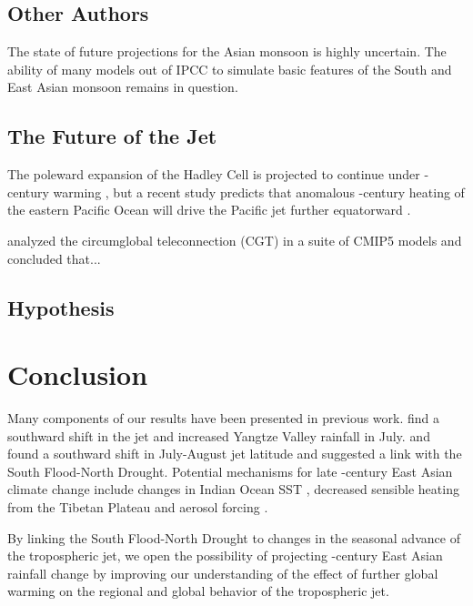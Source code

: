 \subsection{Other Authors}

	The state of future projections for the Asian monsoon is highly uncertain. The ability of many models out of IPCC to simulate basic features of the South and East Asian monsoon remains in question.
	
\subsection{The Future of the Jet}	
	
		The poleward expansion of the Hadley Cell is projected to continue under -century warming \citep{Frierson2007,Lu2007,Kang2012}, but a recent study predicts that anomalous -century heating of the eastern Pacific Ocean will drive the Pacific jet further equatorward \citep{Park2014}.
		
		\citep{Lee2014} analyzed the circumglobal teleconnection (CGT) in a suite of CMIP5 models and concluded that...
		
\subsection{Hypothesis}
 
\section{Conclusion}

	Many components of our results have been presented in previous work. \citet{Xuan2011} find a southward shift in the jet and increased Yangtze Valley rainfall in July. \citet{Yu2004} and \citet{Yu2007} found a southward shift in July-August jet latitude and suggested a link with the South Flood-North Drought. Potential mechanisms for late -century East Asian climate change include changes in Indian Ocean SST \citep{Qu2012}, decreased sensible heating from the Tibetan Plateau \citep{Liu2012a,Hu2015} and aerosol forcing \citep{Song2014}.
	
 By linking the South Flood-North Drought to changes in the seasonal advance of the tropospheric jet, we open the possibility of projecting -century East Asian rainfall change by improving our understanding of the effect of further global warming on the regional and global behavior of the tropospheric jet.
	
